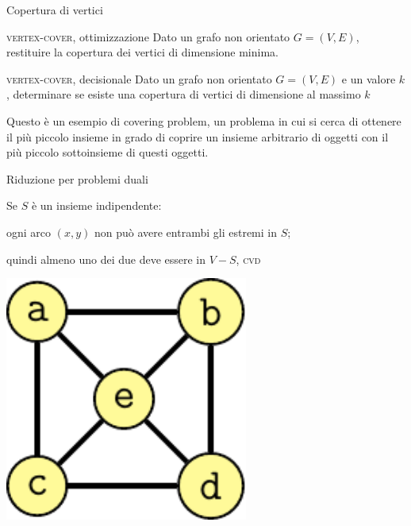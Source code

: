 \begin{frame}{Copertura di vertici}

\vspace{-9pt}
\begin{block}{\textsc{vertex-cover}, ottimizzazione}
Dato un grafo non orientato $G=(V,E)$, restituire la copertura dei vertici
di dimensione minima.
\end{block}

\begin{block}{\textsc{vertex-cover}, decisionale}
Dato un grafo non orientato $G=(V,E)$ e un valore $k$, determinare se
esiste una copertura di vertici di dimensione al massimo $k$
\end{block}

\bigskip
Questo è un esempio di \alert{covering problem}, un problema in cui si cerca
di ottenere il più piccolo insieme in grado di coprire un insieme 
arbitrario di oggetti con il più piccolo sottoinsieme di questi oggetti.

\end{frame}

\begin{frame}{Riduzione per problemi duali}

Se $S$ è un insieme indipendente:
\BI
\item ogni arco $(x,y)$ non può avere entrambi gli estremi in $S$; 
\item quindi almeno uno dei due deve essere in $V-S$, \textsc{cvd}
\EI

\begin{center}
\includegraphics[width=0.6\textwidth,page=3]{independent.pdf}
\end{center}

\end{frame}

